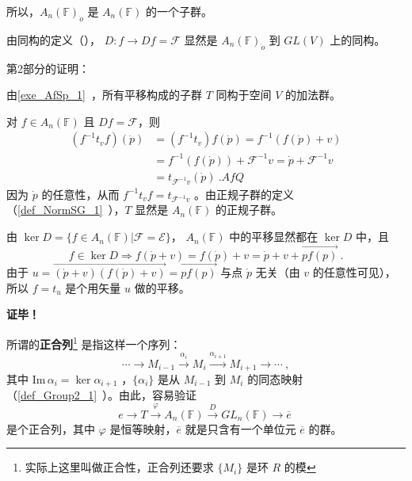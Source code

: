 所以，$A_n(\mathbb F)_{\dot o}$ 是 $A_n(\mathbb F)$ 的一个子群。

由同构的定义（）， $D:f\rightarrow Df=\mathcal F$ 显然是 $A_n(\mathbb F)_{\dot o}$ 到 $GL(V)$ 上的同构。

第2部分的证明：

由\autoref{exe_AfSp_1}~，所有平移构成的子群 $T$ 同构于空间 $V$ 的加法群。
 
对 $f\in A_n(\mathbb F)$ 且 $Df=\mathcal F$，则
\begin{equation}
\begin{aligned}
(f^{-1}t_vf)(\dot p)&=(f^{-1}t_v)f(\dot p)=f^{-1}(f(\dot p)+v)\\
&=f^{-1}(f(\dot p))+\mathcal F^{-1}v=\dot p+\mathcal F^{-1}v\\
&=t_{\mathcal F^{-1}v}(\dot p)~.AfQ
\end{aligned}
\end{equation}
因为 $\dot p$ 的任意性，从而 $f^{-1}t_vf=t_{\mathcal F^{-1}v}$ 。由正规子群的定义（\autoref{def_NormSG_1}~），$T$ 显然是 $A_n(\mathbb F)$ 的正规子群。

由 $\ker D=\{f\in A_n(\mathbb F)|\mathcal F=\mathcal E\}$， $A_n(\mathbb F)$ 中的平移显然都在 $\ker D$ 中，且
\begin{equation}
f\in \ker D\Rightarrow f(\dot p+v)=f(\dot p)+v=\dot p+v+\overrightarrow{pf(p)}~.
\end{equation}
由于 $u=\overrightarrow{(\dot p+v)(f(\dot p)+v)}=\overrightarrow{pf(p)}$ 与点 $\dot p$ 无关（由 $v$ 的任意性可见），所以 $f=t_u$ 是个用矢量 $u$ 做的平移。

\textbf{证毕！}

所谓的\textbf{正合列}\footnote{实际上这里叫做正合性，正合列还要求 $\{M_i\}$ 是环 $R$ 的模} 是指这样一个序列：
\begin{equation}
\cdots\rightarrow M_{i-1}\xrightarrow{\alpha_i} M_{i}\xrightarrow{\alpha_{i+1}}M_{i+1}\rightarrow\cdots~,
\end{equation}
其中 $\mathrm{Im}\,\alpha_{i}=\ker\alpha_{i+1}$ ，$\{\alpha_i\}$ 是从 $M_{i-1}$ 到 $M_i$ 的同态映射（\autoref{def_Group2_1}~）。由此，容易验证
\begin{equation}
e\rightarrow T\xrightarrow{\varphi}A_n(\mathbb F)\xrightarrow{D} GL_n(\mathbb F)\rightarrow \overline{e}~
\end{equation}
是个正合列，其中 $\varphi$ 是恒等映射，$\overline{e}$ 就是只含有一个单位元 $\overline{e}$ 的群。 
